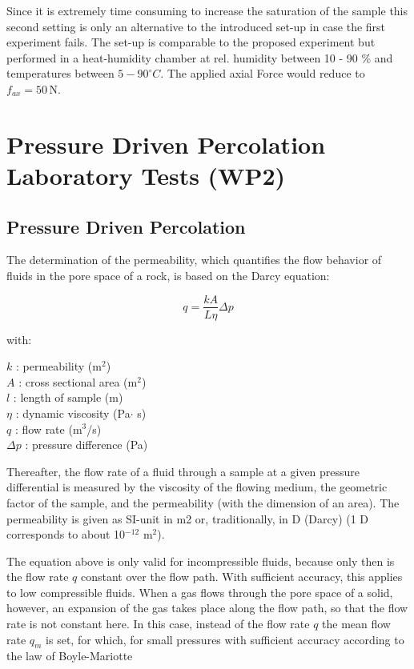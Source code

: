 Since it is extremely time consuming to increase the saturation of the sample this second setting is only an alternative to the introduced set-up in case the first experiment fails. The set-up is comparable to the proposed experiment but performed in a heat-humidity chamber at rel. humidity between 10 - 90 \% and temperatures between $5-90^\circ C$. The applied axial Force would reduce to $f_{ax} = 50 \, \text{N}$.

\section{Pressure Driven Percolation Laboratory Tests (WP2)}
\subsection{Pressure Driven Percolation}
The determination of the permeability, which quantifies the flow behavior of fluids in the pore space of a rock, is based on the 
Darcy equation:

\begin{equation}
q = \frac{kA}{L\eta}\Delta p
\end{equation}

with:

$k$ : permeability (m$^2$) \\
$A$ : cross sectional area (m$^2$) \\
$l$ : length of sample (m) \\
$\eta$ : dynamic viscosity (Pa$\cdot$ s) \\
$q$ : flow rate (m$^3$/s) \\
$\Delta p$ : pressure difference (Pa)

Thereafter, the flow rate of a fluid through a sample at a given pressure differential is measured by the viscosity of 
the flowing medium, the geometric factor of the sample, and the permeability (with the dimension of an area). The 
permeability is given as SI-unit in m2 or, traditionally, in D (Darcy) (1 D corresponds to about 10$^{-12}$ m$^2$).

The equation above is only valid for incompressible fluids, because only then is the flow rate $q$ constant over the flow path. 
With sufficient accuracy, this applies to low compressible fluids.
When a gas flows through the pore space of a solid, however, an expansion of the gas takes place along the flow path, so that the 
flow rate is not constant here. In this case, instead of the flow rate $q$ the mean flow rate $q_m$ is set, for which, for small 
pressures with sufficient accuracy according to the law of Boyle-Mariotte 

